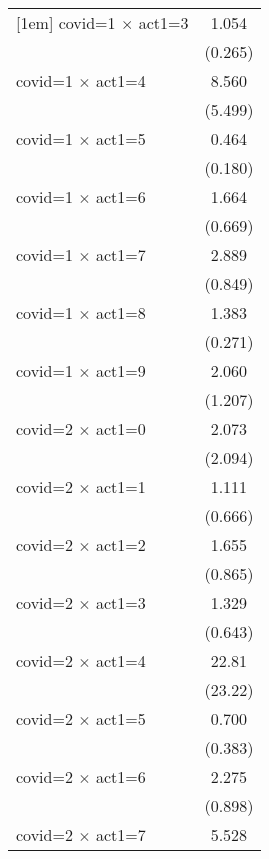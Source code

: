 {\begin{tabular}{l*{1}{c}}
[1em]
covid=1 $\times$ act1=3&       1.054         \\
                    &     (0.265)         \\
[1em]
covid=1 $\times$ act1=4&       8.560\sym{***}\\
                    &     (5.499)         \\
[1em]
covid=1 $\times$ act1=5&       0.464\sym{*}  \\
                    &     (0.180)         \\
[1em]
covid=1 $\times$ act1=6&       1.664         \\
                    &     (0.669)         \\
[1em]
covid=1 $\times$ act1=7&       2.889\sym{***}\\
                    &     (0.849)         \\
[1em]
covid=1 $\times$ act1=8&       1.383         \\
                    &     (0.271)         \\
[1em]
covid=1 $\times$ act1=9&       2.060         \\
                    &     (1.207)         \\
[1em]
covid=2 $\times$ act1=0&       2.073         \\
                    &     (2.094)         \\
[1em]
covid=2 $\times$ act1=1&       1.111         \\
                    &     (0.666)         \\
[1em]
covid=2 $\times$ act1=2&       1.655         \\
                    &     (0.865)         \\
[1em]
covid=2 $\times$ act1=3&       1.329         \\
                    &     (0.643)         \\
[1em]
covid=2 $\times$ act1=4&       22.81\sym{**} \\
                    &     (23.22)         \\
[1em]
covid=2 $\times$ act1=5&       0.700         \\
                    &     (0.383)         \\
[1em]
covid=2 $\times$ act1=6&       2.275\sym{*}  \\
                    &     (0.898)         \\
[1em]
covid=2 $\times$ act1=7&       5.528\sym{***}\\

\end{tabular}}
